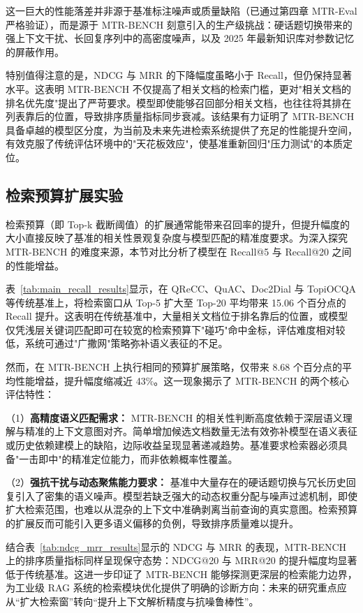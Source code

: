 这一巨大的性能落差并非源于基准标注噪声或质量缺陷（已通过第四章 MTR-Eval 严格验证），而是源于 MTR-BENCH 刻意引入的生产级挑战：硬话题切换带来的强上下文干扰、长回复序列中的高密度噪声，以及 2025 年最新知识库对参数记忆的屏蔽作用。



特别值得注意的是，NDCG 与 MRR 的下降幅度虽略小于 Recall，但仍保持显著水平。这表明 MTR-BENCH 不仅提高了相关文档的检索门槛，更对"相关文档的排名优先度"提出了严苛要求。模型即使能够召回部分相关文档，也往往将其排在列表靠后的位置，导致排序质量指标同步衰减。该结果有力证明了 MTR-BENCH 具备卓越的模型区分度，为当前及未来先进检索系统提供了充足的性能提升空间，有效克服了传统评估环境中的"天花板效应"，使基准重新回归"压力测试"的本质定位。

\subsection{检索预算扩展实验}
\label{subsec:budget_expansion}

检索预算（即 Top-k 截断阈值）的扩展通常能带来召回率的提升，但提升幅度的大小直接反映了基准的相关性景观复杂度与模型匹配的精准度要求。为深入探究 MTR-BENCH 的难度来源，本节对比分析了模型在 Recall@5 与 Recall@20 之间的性能增益。

表~\ref{tab:main_recall_results}显示，在 QReCC、QuAC、Doc2Dial 与 TopiOCQA 等传统基准上，将检索窗口从 Top-5 扩大至 Top-20 平均带来 15.06 个百分点的 Recall 提升。这表明在传统基准中，大量相关文档位于排名靠后的位置，或模型仅凭浅层关键词匹配即可在较宽的检索预算下"碰巧"命中金标，评估难度相对较低，系统可通过"广撒网"策略弥补语义表征的不足。

然而，在 MTR-BENCH 上执行相同的预算扩展策略，仅带来 8.68 个百分点的平均性能增益，提升幅度缩减近 43\%。这一现象揭示了 MTR-BENCH 的两个核心评估特性：

（1）\textbf{高精度语义匹配需求：} MTR-BENCH 的相关性判断高度依赖于深层语义理解与精准的上下文意图对齐。简单增加候选文档数量无法有效弥补模型在语义表征或历史依赖建模上的缺陷，边际收益呈现显著递减趋势。基准要求检索器必须具备"一击即中"的精准定位能力，而非依赖概率性覆盖。

（2）\textbf{强抗干扰与动态聚焦能力要求：} 基准中大量存在的硬话题切换与冗长历史回复引入了密集的语义噪声。模型若缺乏强大的动态权重分配与噪声过滤机制，即使扩大检索范围，也难以从混杂的上下文中准确剥离当前查询的真实意图。检索预算的扩展反而可能引入更多语义偏移的负例，导致排序质量难以提升。


结合表~\ref{tab:ndcg_mrr_results}显示的 NDCG 与 MRR 的表现，MTR-BENCH 上的排序质量指标同样呈现保守态势：NDCG@20 与 MRR@20 的提升幅度均显著低于传统基准。这进一步印证了 MTR-BENCH 能够探测更深层的检索能力边界，为工业级 RAG 系统的检索模块优化提供了明确的诊断方向：未来的研究重点应从``扩大检索窗''转向``提升上下文解析精度与抗噪鲁棒性''。























